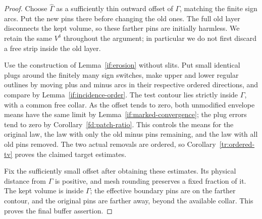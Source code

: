 \begin{proof}
Choose $\widehat\Gamma$ as a sufficiently thin outward offset of
$\Gamma$, matching the finite sign arcs.  Put the new pins there
before changing the old ones.  The full old layer disconnects the
kept volume, so these farther pins are initially harmless.  We
retain the same $V^\delta$ throughout the argument; in particular
we do not first discard a free strip inside the old layer.

Use the construction of Lemma~\ref{if:erosion} without slits.
Put small identical plugs around the finitely many sign switches,
make upper and lower regular outlines by moving plus and minus
arcs in their respective ordered directions, and compare by
Lemma~\ref{if:incidence-order}.  The test contour lies strictly
inside $\Gamma$, with a common free collar.  As the offset tends
to zero, both unmodified envelope means have the same limit by
Lemma~\ref{if:marked-convergence}; the plug errors tend to zero
by Corollary~\ref{fd:patch-ratio}.  This controls the means for the
original law, the law with only the old minus pins remaining,
and the law with all old pins removed.  The two actual removals
are ordered, so Corollary~\ref{tr:ordered-tv} proves the claimed
target estimates.

Fix the sufficiently small offset after obtaining these estimates.
Its physical distance from $\Gamma$ is positive, and mesh rounding
preserves a fixed fraction of it.  The kept volume is inside
$\Gamma$; the effective boundary pins are on the farther contour,
and the original pins are farther away, beyond the available collar.
This proves the final buffer assertion.
\end{proof}

